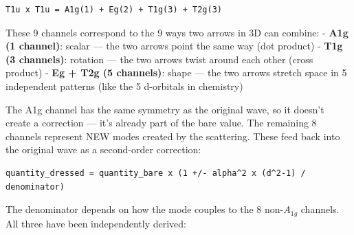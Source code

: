 \documentclass[
]{article}
\begin{document}
\begin{verbatim}
T1u x T1u = A1g(1) + Eg(2) + T1g(3) + T2g(3)
\end{verbatim}

These 9 channels correspond to the 9 ways two arrows in 3D can combine:
- \textbf{A1g (1 channel)}: scalar --- the two arrows point the same way
(dot product) - \textbf{T1g (3 channels)}: rotation --- the two arrows
twist around each other (cross product) - \textbf{Eg + T2g (5
channels)}: shape --- the two arrows stretch space in 5 independent
patterns (like the 5 d-orbitals in chemistry)

The A1g channel has the same symmetry as the original wave, so it
doesn't create a correction --- it's already part of the bare value. The
remaining 8 channels represent NEW modes created by the scattering.
These feed back into the original wave as a second-order correction:

\begin{verbatim}
quantity_dressed = quantity_bare x (1 +/- alpha^2 x (d^2-1) / denominator)
\end{verbatim}

The denominator depends on how the mode couples to the 8 non-\(A_{1g}\)
channels. All three have been independently derived:
\end{document}
